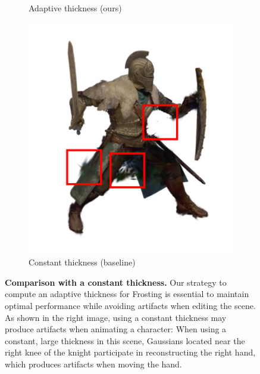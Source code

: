 \begin{figure}[tb]
\begin{subfigure}{0.31\linewidth}
  \caption{\tiny Adaptive thickness (ours)}
  \end{subfigure}
  \hfill
  \begin{subfigure}{0.31\linewidth}
  \includegraphics[width=\linewidth]{images/artifacts/with_artifact_0.jpg}
  \caption{\tiny Constant thickness (baseline)}
  \end{subfigure}
  \caption{
  \textbf{Comparison with a constant thickness.} Our strategy to compute an adaptive thickness for Frosting is essential to maintain optimal performance while avoiding artifacts when editing the scene. As shown in the right image, using a constant thickness may produce artifacts when animating a character: When using a constant, large thickness in this scene, Gaussians located near the right knee of the knight participate in reconstructing the right hand, which produces artifacts when moving the hand.
  }
  \label{fig:artifacts}
\end{figure}